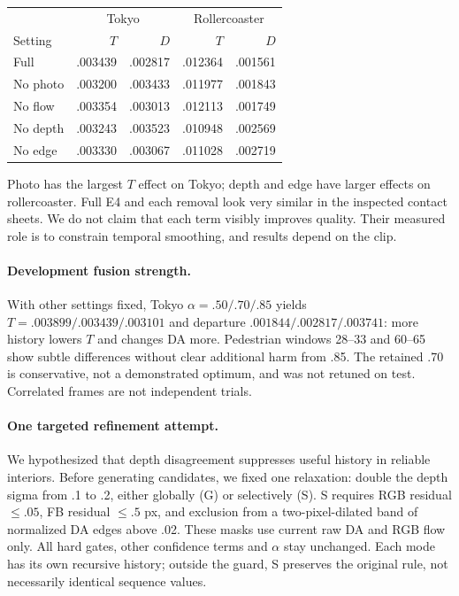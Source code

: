 \documentclass[10pt,twocolumn,letterpaper]{article}
\begin{document}
\begin{center}\begin{minipage}{\linewidth}\centering
{}
\small
\begin{tabular}{lrrrr}
\toprule
&\multicolumn{2}{c}{Tokyo}&\multicolumn{2}{c}{Rollercoaster}\\
Setting &$T$&$D$&$T$&$D$\\
\midrule
Full&.003439&.002817&.012364&.001561\\
No photo&.003200&.003433&.011977&.001843\\
No flow&.003354&.003013&.012113&.001749\\
No depth&.003243&.003523&.010948&.002569\\
No edge&.003330&.003067&.011028&.002719\\
\bottomrule
\end{tabular}
\end{minipage}\end{center}

Photo has the largest $T$ effect on Tokyo; depth and edge have larger effects on rollercoaster. Full E4 and each removal look very similar in the inspected contact sheets. We do not claim that each term visibly improves quality. Their measured role is to constrain temporal smoothing, and results depend on the clip.

\paragraph{Development fusion strength.}
With other settings fixed, Tokyo $\alpha=.50/.70/.85$ yields $T=.003899/.003439/.003101$ and departure $.001844/.002817/.003741$: more history lowers $T$ and changes DA more. Pedestrian windows 28--33 and 60--65 show subtle differences without clear additional harm from .85. The retained .70 is conservative, not a demonstrated optimum, and was not retuned on test. Correlated frames are not independent trials.

\paragraph{One targeted refinement attempt.}
We hypothesized that depth disagreement suppresses useful history in reliable interiors. Before generating candidates, we fixed one relaxation: double the depth sigma from .1 to .2, either globally (G) or selectively (S). S requires RGB residual $\le .05$, FB residual $\le .5$ px, and exclusion from a two-pixel-dilated band of normalized DA edges above .02. These masks use current raw DA and RGB flow only. All hard gates, other confidence terms and $\alpha$ stay unchanged. Each mode has its own recursive history; outside the guard, S preserves the original rule, not necessarily identical sequence values.
\end{document}
